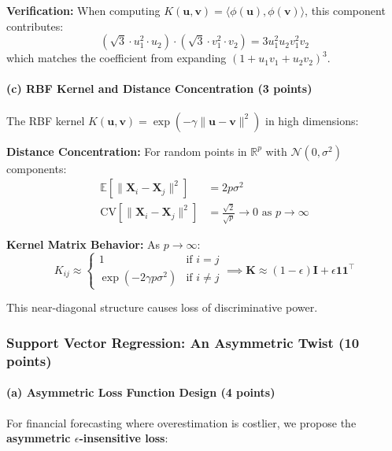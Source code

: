 \documentclass[12pt,a4paper]{article}
\newcommand{\R}{\mathbb{R}}
\theoremstyle{definition}
\begin{document}
\textbf{Verification:} When computing $K(\mathbf{u}, \mathbf{v}) = \langle\phi(\mathbf{u}), \phi(\mathbf{v})\rangle$, this component contributes:
\begin{equation}
(\sqrt{3} \cdot u_1^2 \cdot u_2) \cdot (\sqrt{3} \cdot v_1^2 \cdot v_2) = 3 u_1^2 u_2 v_1^2 v_2
\end{equation}
which matches the coefficient from expanding $(1 + u_1v_1 + u_2v_2)^3$.

\paragraph{(c) RBF Kernel and Distance Concentration (3 points)}

The RBF kernel $K(\mathbf{u}, \mathbf{v}) = \exp(-\gamma\|\mathbf{u} - \mathbf{v}\|^2)$ in high dimensions:

\textbf{Distance Concentration:} For random points in $\R^p$ with $\mathcal{N}(0, \sigma^2)$ components:
\begin{align}
\mathbb{E}[\|\mathbf{X}_i - \mathbf{X}_j\|^2] &= 2p\sigma^2\\
\text{CV}[\|\mathbf{X}_i - \mathbf{X}_j\|^2] &= \frac{\sqrt{2}}{\sqrt{p}} \to 0 \text{ as } p \to \infty
\end{align}

\textbf{Kernel Matrix Behavior:} As $p \to \infty$:
\begin{equation}
K_{ij} \approx \begin{cases}
1 & \text{if } i = j\\
\exp(-2\gamma p\sigma^2) & \text{if } i \neq j
\end{cases} \implies \mathbf{K} \approx (1-\epsilon)\mathbf{I} + \epsilon\mathbf{1}\mathbf{1}^\top
\end{equation}

This near-diagonal structure causes loss of discriminative power.

\subsubsection{Support Vector Regression: An Asymmetric Twist (10 points)}

\paragraph{(a) Asymmetric Loss Function Design (4 points)}

For financial forecasting where overestimation is costlier, we propose the \textbf{asymmetric $\epsilon$-insensitive loss}:
\end{document}
